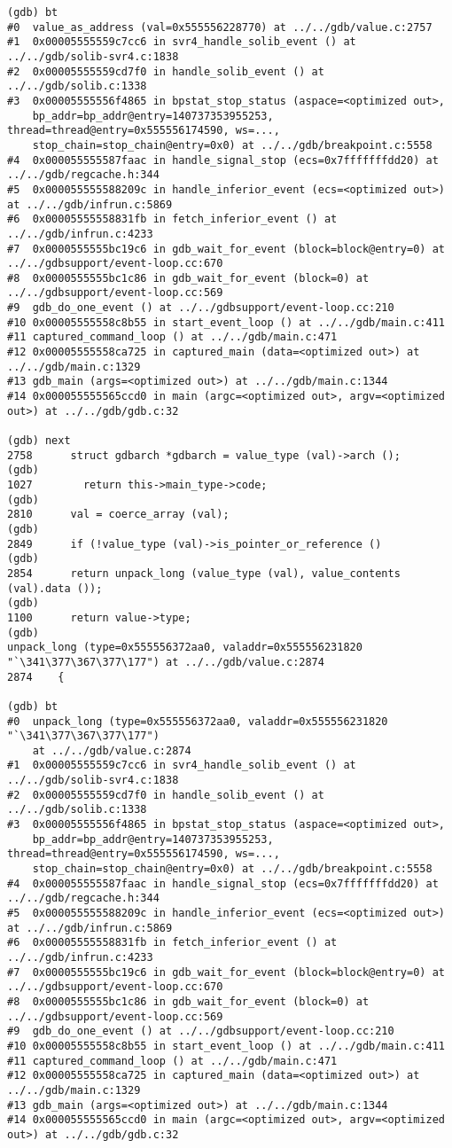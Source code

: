 \documentclass{report}
\begin{document}
\begin{verbatim}
(gdb) bt
#0  value_as_address (val=0x555556228770) at ../../gdb/value.c:2757
#1  0x00005555559c7cc6 in svr4_handle_solib_event () at ../../gdb/solib-svr4.c:1838
#2  0x00005555559cd7f0 in handle_solib_event () at ../../gdb/solib.c:1338
#3  0x00005555556f4865 in bpstat_stop_status (aspace=<optimized out>, 
    bp_addr=bp_addr@entry=140737353955253, thread=thread@entry=0x555556174590, ws=..., 
    stop_chain=stop_chain@entry=0x0) at ../../gdb/breakpoint.c:5558
#4  0x000055555587faac in handle_signal_stop (ecs=0x7fffffffdd20) at ../../gdb/regcache.h:344
#5  0x000055555588209c in handle_inferior_event (ecs=<optimized out>) at ../../gdb/infrun.c:5869
#6  0x00005555558831fb in fetch_inferior_event () at ../../gdb/infrun.c:4233
#7  0x0000555555bc19c6 in gdb_wait_for_event (block=block@entry=0) at ../../gdbsupport/event-loop.cc:670
#8  0x0000555555bc1c86 in gdb_wait_for_event (block=0) at ../../gdbsupport/event-loop.cc:569
#9  gdb_do_one_event () at ../../gdbsupport/event-loop.cc:210
#10 0x00005555558c8b55 in start_event_loop () at ../../gdb/main.c:411
#11 captured_command_loop () at ../../gdb/main.c:471
#12 0x00005555558ca725 in captured_main (data=<optimized out>) at ../../gdb/main.c:1329
#13 gdb_main (args=<optimized out>) at ../../gdb/main.c:1344
#14 0x000055555565ccd0 in main (argc=<optimized out>, argv=<optimized out>) at ../../gdb/gdb.c:32

(gdb) next
2758	  struct gdbarch *gdbarch = value_type (val)->arch ();
(gdb) 
1027	    return this->main_type->code;
(gdb) 
2810	  val = coerce_array (val);
(gdb) 
2849	  if (!value_type (val)->is_pointer_or_reference ()
(gdb) 
2854	  return unpack_long (value_type (val), value_contents (val).data ());
(gdb) 
1100	  return value->type;
(gdb) 
unpack_long (type=0x555556372aa0, valaddr=0x555556231820 "`\341\377\367\377\177") at ../../gdb/value.c:2874
2874	{

(gdb) bt
#0  unpack_long (type=0x555556372aa0, valaddr=0x555556231820 "`\341\377\367\377\177")
    at ../../gdb/value.c:2874
#1  0x00005555559c7cc6 in svr4_handle_solib_event () at ../../gdb/solib-svr4.c:1838
#2  0x00005555559cd7f0 in handle_solib_event () at ../../gdb/solib.c:1338
#3  0x00005555556f4865 in bpstat_stop_status (aspace=<optimized out>, 
    bp_addr=bp_addr@entry=140737353955253, thread=thread@entry=0x555556174590, ws=..., 
    stop_chain=stop_chain@entry=0x0) at ../../gdb/breakpoint.c:5558
#4  0x000055555587faac in handle_signal_stop (ecs=0x7fffffffdd20) at ../../gdb/regcache.h:344
#5  0x000055555588209c in handle_inferior_event (ecs=<optimized out>) at ../../gdb/infrun.c:5869
#6  0x00005555558831fb in fetch_inferior_event () at ../../gdb/infrun.c:4233
#7  0x0000555555bc19c6 in gdb_wait_for_event (block=block@entry=0) at ../../gdbsupport/event-loop.cc:670
#8  0x0000555555bc1c86 in gdb_wait_for_event (block=0) at ../../gdbsupport/event-loop.cc:569
#9  gdb_do_one_event () at ../../gdbsupport/event-loop.cc:210
#10 0x00005555558c8b55 in start_event_loop () at ../../gdb/main.c:411
#11 captured_command_loop () at ../../gdb/main.c:471
#12 0x00005555558ca725 in captured_main (data=<optimized out>) at ../../gdb/main.c:1329
#13 gdb_main (args=<optimized out>) at ../../gdb/main.c:1344
#14 0x000055555565ccd0 in main (argc=<optimized out>, argv=<optimized out>) at ../../gdb/gdb.c:32


\end{verbatim}
\end{document}
